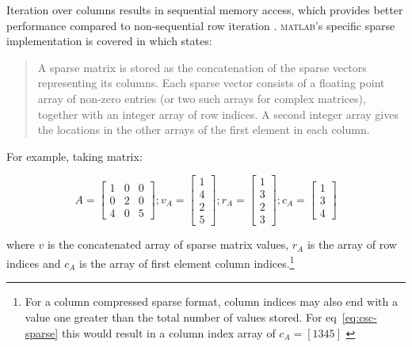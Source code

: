 Iteration over columns results in sequential memory access, which provides better performance compared to non-sequential row iteration \cite{dongarra_linpack_1979}. \textsc{matlab}'s specific sparse implementation is covered in \textcite[p. 335]{gilbert_sparse_1992} which states:

\begin{quotation}
   A sparse matrix is stored as the concatenation of the
sparse vectors representing its columns. Each sparse vector consists of a floating point
array of non-zero entries (or two such arrays for complex matrices), together with an
integer array of row indices. A second integer array gives the locations in the other
arrays of the first element in each column.
\end{quotation}

For example, taking matrix:

\begin{equation}\label{eq:csc-sparse}
    A = \begin{bmatrix}
            1 & 0 & 0 \\
            0 & 2 & 0 \\
            4 & 0 & 5
        \end{bmatrix}; v_{A} =\begin{bmatrix}1\\4\\2\\5\end{bmatrix} ; r_{A} = \begin{bmatrix}1\\3\\2\\3\end{bmatrix}; c_{A} = \begin{bmatrix}1\\3\\4\end{bmatrix}
\end{equation}

where $v$ is the concatenated array of sparse matrix values, $r_{A}$ is the array of row indices and $c_{A}$ is the array of first element column indices.\footnote{For a column compressed sparse format, column indices may also end with a value one greater than the total number of values stored. For eq~\ref{eq:csc-sparse} this would result in a column index array of $c_{A} = [1 3 4 5]$ \cite{nvidia_sparse_2025}}

